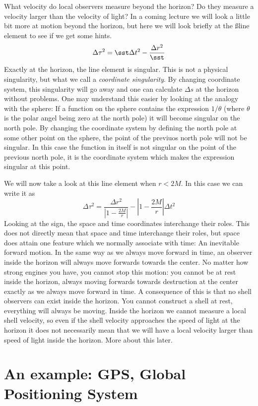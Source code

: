 {\begin{multicols}{2}
What velocity do local observers measure beyond the horizon? Do they measure a velocity larger than the velocity of light? In a coming lecture we will look a little bit more at motion beyond the horizon, but here we will look briefly at the \ss line element to see if we get some hints.
\[
\Delta\tau^2=\sst \Delta t^2-\frac{\Delta r^2}{\sst}
\]
Exactly at the horizon, the line element is singular. This is not a physical singularity, but what we call a {\it coordinate singularity}. By changing coordinate system, this singularity will go away and one can calculate $\Delta s$ at the horizon without problems. One may understand this easier by looking at the analogy with the sphere: If a function on the sphere contains the expression $1/\theta$ (where $\theta$ is the polar angel being zero at the north pole) it will become singular on the north pole. By changing the coordinate system by defining the north pole at some other point on the sphere, the point of the previuos north pole will not be singular. In this case the function in itself is not singular on the point of the previous north pole, it is the coordinate system which makes the expression singular at this point.

We will now take a look at this line element when $r<2M$. In this case we can write it as
\[
\Delta\tau^2=\frac{\Delta r^2}{\left|1-\frac{2M}{r}\right|}-\left|1-\frac{2M}{r}\right|\Delta t^2
\]
Looking at the sign, the space and time coordinates interchange their roles. This does not directly mean that space and time interchange their roles, but space does attain one feature which we normally associate with time: An inevitable forward motion. In the same way as we always move forward in time, an observer inside the horizon will always move forwards towards the center. No matter how strong engines you have, you cannot stop this motion: you cannot be at rest inside the horizon, always moving forwards towards destruction at the center exactly as we always move forward in time. A consequence of this is that no shell observers can exist inside the horizon. You cannot construct a shell at rest, everything will always be moving. Inside the horizon we cannot measure a local shell velocity, so even if the shell velocity approaches the speed of light at the horizon it does not necessarily mean that we will have a local velocity larger than speed of light inside the horizon. More about this later.

\section{An example: GPS, Global Positioning System}
\label{sect:gps}


\end{multicols}}
